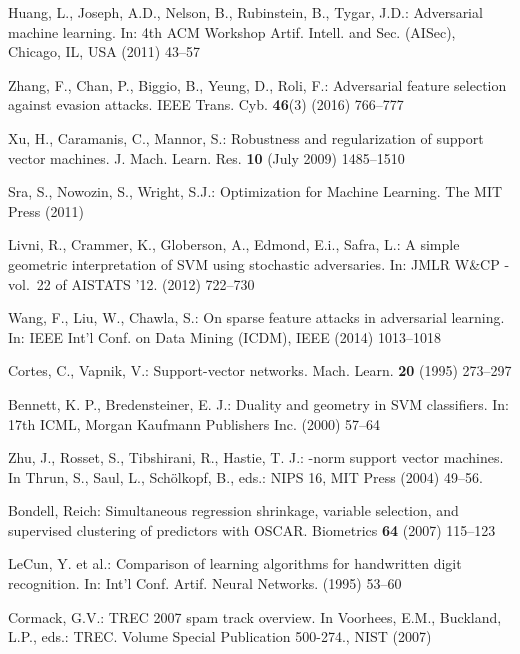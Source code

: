 \documentclass[runningheads,a4paper]{llncs}
\begin{document}
\begin{thebibliography}{10}
Huang, L., Joseph, A.D., Nelson, B., Rubinstein, B., Tygar, J.D.:
\newblock Adversarial machine learning.
\newblock In: 4th ACM Workshop Artif. Intell. and Sec. ({AISec}), Chicago, IL, USA (2011)  43--57

Zhang, F., Chan, P., Biggio, B., Yeung, D., Roli, F.:
\newblock Adversarial feature selection against evasion attacks.
\newblock IEEE Trans. Cyb. \textbf{46}(3) (2016)  766--777

Xu, H., Caramanis, C., Mannor, S.:
\newblock Robustness and regularization of support vector machines.
\newblock J. Mach. Learn. Res. \textbf{10} (July 2009)
  1485--1510

Sra, S., Nowozin, S., Wright, S.J.:
\newblock Optimization for Machine Learning.
\newblock The MIT Press (2011)

Livni, R., Crammer, K., Globerson, A., Edmond, E.i., Safra, L.:
\newblock A simple geometric interpretation of {SVM} using stochastic
  adversaries.
\newblock In: JMLR W\&CP - vol.~22 of AISTATS '12. (2012)  722--730

Wang, F., Liu, W., Chawla, S.:
\newblock On sparse feature attacks in adversarial learning.
\newblock In: IEEE Int'l Conf. on Data Mining (ICDM), IEEE (2014)  1013--1018

Cortes, C., Vapnik, V.:
\newblock Support-vector networks.
\newblock Mach. Learn. \textbf{20} (1995)  273--297

Bennett, K. P., Bredensteiner, E. J.:
\newblock Duality and geometry in SVM classifiers.
\newblock In: 17th ICML, Morgan Kaufmann Publishers Inc. (2000)  57--64

Zhu, J., Rosset, S., Tibshirani, R., Hastie, T. J.:
-norm support vector machines.
\newblock In Thrun, S., Saul, L., Sch\"olkopf, B., eds.: NIPS 16, MIT Press (2004)  49--56.

Bondell, Reich:
\newblock Simultaneous regression shrinkage, variable selection, and supervised
  clustering of predictors with {OSCAR}.
\newblock Biometrics \textbf{64} (2007)  115--123


LeCun, Y. et al.:
\newblock Comparison of learning algorithms for handwritten digit recognition.
\newblock In: Int'l Conf. Artif. Neural Networks. (1995)  53--60

Cormack, G.V.:
\newblock TREC 2007 spam track overview.
\newblock In Voorhees, E.M., Buckland, L.P., eds.: TREC. Volume Special
  Publication 500-274., NIST (2007)


\end{thebibliography}
\end{document}
